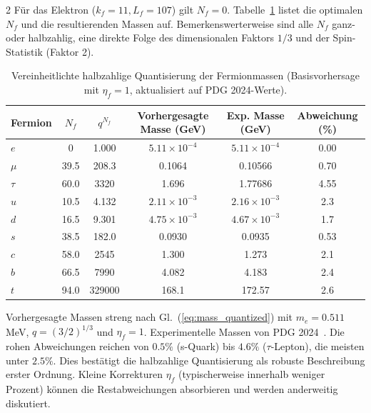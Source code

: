 \documentclass[11pt,a4paper]{article}
\begin{document}
\begin{multicols}{2}
		Für das Elektron (\(k_f=11, L_f=107\)) gilt \(N_f=0\). Tabelle~\ref{tab:fermions_new} listet die optimalen \(N_f\) und die resultierenden Massen auf. Bemerkenswerterweise sind alle \(N_f\) ganz- oder halbzahlig, eine direkte Folge des dimensionalen Faktors \(1/3\) und der Spin-Statistik (Faktor 2).
		
		\begin{table}[H]
			\centering
			\caption{Vereinheitlichte halbzahlige Quantisierung der Fermionmassen (Basisvorhersage mit \(\eta_f=1\), aktualisiert auf PDG 2024-Werte).}
			\label{tab:fermions_new}
			\tiny  
			\begin{tabular}{l c c c c c}
				\toprule
				Fermion & \(N_f\) & \(q^{N_f}\) & Vorhergesagte Masse (GeV) & Exp. Masse (GeV) & Abweichung (\%) \\
				\midrule
				\(e\)   & 0      & 1.000 & \(5.11\times10^{-4}\) & \(5.11\times10^{-4}\) & 0.00 \\
				\(\mu\)  & 39.5   & 208.3 & 0.1064                & 0.10566              & 0.70 \\
				\(\tau\) & 60.0   & 3320  & 1.696                 & 1.77686              & 4.55 \\
				\(u\)   & 10.5   & 4.132 & \(2.11\times10^{-3}\)   & \(2.16\times10^{-3}\)  & 2.3 \\
				\(d\)   & 16.5   & 9.301 & \(4.75\times10^{-3}\)   & \(4.67\times10^{-3}\)  & 1.7 \\
				\(s\)   & 38.5   & 182.0 & 0.0930                & 0.0935               & 0.53 \\
				\(c\)   & 58.0   & 2545  & 1.300                 & 1.273                & 2.1 \\
				\(b\)   & 66.5   & 7990  & 4.082                 & 4.183                & 2.4 \\
				\(t\)   & 94.0   & 329000& 168.1                 & 172.57               & 2.6 \\
				\bottomrule
			\end{tabular}
			\par\smallskip
			\footnotesize 
			Vorhergesagte Massen streng nach Gl.~(\ref{eq:mass_quantized}) mit \(m_e = 0.511\) MeV, \(q = (3/2)^{1/3}\) und \(\eta_f = 1\). 
			Experimentelle Massen von PDG 2024~\cite{PDG2024}. 
			Die rohen Abweichungen reichen von \(0.5\%\) (s-Quark) bis \(4.6\%\) (\(\tau\)-Lepton), die meisten unter \(2.5\%\). 
			Dies bestätigt die halbzahlige Quantisierung als robuste Beschreibung erster Ordnung. 
			Kleine Korrekturen \(\eta_f\) (typischerweise innerhalb weniger Prozent) können die Restabweichungen absorbieren und werden anderweitig diskutiert.
		\end{table}
		

\end{multicols}
\end{document}
